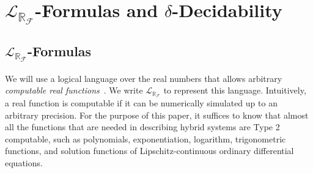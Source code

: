 \documentclass[10pt]{article}
\theoremstyle{plain}
\theoremstyle{definition}
\newcommand{\lrf}{\mathcal{L}_{\mathbb{R}_{\mathcal{F}}}}
\begin{document}
\section{$\lrf$-Formulas and $\delta$-Decidability}

\subsection{$\lrf$-Formulas}
We will use a logical language over the real numbers that allows arbitrary {\em computable real functions}~\cite{CAbook}. We write $\lrf$ to represent this language. Intuitively, a real function is computable if it can be numerically simulated up to an arbitrary precision. For the purpose of this paper, it suffices to know that almost all the functions that are needed in describing hybrid systems are Type 2 computable, such as polynomials, exponentiation, logarithm, trigonometric functions, and solution functions of Lipschitz-continuous ordinary differential equations.
\end{document}
